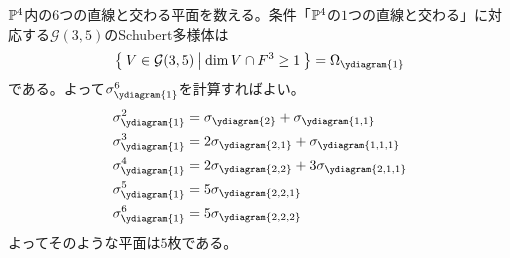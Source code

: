 \documentclass{ltjsreport}
\begin{document}
\begin{eg}
  $\mathbb{P}^4$内の$6$つの直線と交わる平面を数える。条件「$\mathbb{P}^4$の$1$つの直線と交わる」に対応する$\mathcal{G}(3,5)$のSchubert多様体は
  \[
  \set{V\in\mathcal{G}(3,5)}{\dim V\cap F^3\geq 1}=\Omega_{\ydiagram{1}}  
  \]
  である。よって$\sigma_{\ydiagram{1}}^6$を計算すればよい。
  \begin{align*}
    &\sigma_{\ydiagram{1}}^2
    =\sigma_{\ydiagram{2}}+\sigma_{\ydiagram{1,1}}\\
    &\sigma_{\ydiagram{1}}^3=2\sigma_{\ydiagram{2,1}}+\sigma_{\ydiagram{1,1,1}}\\
    &\sigma_{\ydiagram{1}}^4=2\sigma_{\ydiagram{2,2}}+3\sigma_{\ydiagram{2,1,1}}\\
    &\sigma_{\ydiagram{1}}^5=5\sigma_{\ydiagram{2,2,1}}\\
    &\sigma_{\ydiagram{1}}^6=5\sigma_{\ydiagram{2,2,2}}
  \end{align*}
  よってそのような平面は$5$枚である。
\end{eg}
\end{document}
